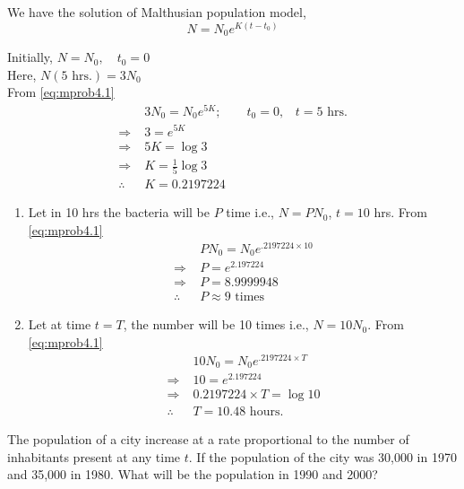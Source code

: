 \documentclass[../main-sheet.tex]{subfiles}
\begin{document}
\begin{soln}
    We have the solution of Malthusian population model,
    \begin{equation}
        N=N_0e^{K(t-t_0)}\label{eq:mprob4.1}
    \end{equation}
    
    
    Initially, \(N=N_0,\quad t_0=0\)\\
    Here, \(N(5 \text{ hrs.})=3N_0\)\\
    From \eqref{eq:mprob4.1}
    \begin{align*}
        &3N_0= N_0 e^{5K};\qquad t_0=0,\;\;\;t=5 \text{ hrs.}\\
        \Rightarrow\;&3= e^{5K}\\
        \Rightarrow\;&5K= \log 3\\
        \Rightarrow\;&K= \frac{1}{5}\log 3\\
        \therefore\;&K= 0.2197224
    \end{align*}
    \begin{enumerate}[label=(\alph*)]
        \item Let in 10 hrs the bacteria will be \(P \) time i.e., \(N=PN_0\), \(t=10 \) hrs.
        From \eqref{eq:mprob4.1}
        \begin{align*}
            &PN_0=N_0 e^{.2197224\times 10}\\
            \Rightarrow\;&P=e^{2.197224}\\
            \Rightarrow\;&P=8.9999948\\
            \therefore\;&P\approx 9 \text{ times}
        \end{align*}
        \item Let at time \(t=T\), the number will be 10 times i.e., \(N=10N_0\).
        From \eqref{eq:mprob4.1}
        \begin{align*}
            &10N_0=N_0 e^{.2197224\times T}\\
            \Rightarrow\;&10=e^{2.197224}\\
            \Rightarrow\;&0.2197224\times T=\log 10\\
            \therefore\;&T=10.48\text{ hours.}
        \end{align*}
    \end{enumerate}
\end{soln}
\begin{prob}
    The population of a city increase at a rate proportional to the number of inhabitants present at any time \(t\). If the population of the city was 30,000 in 1970 and 35,000 in 1980. What will be the population in 1990 and 2000?
\end{prob}
\end{document}
